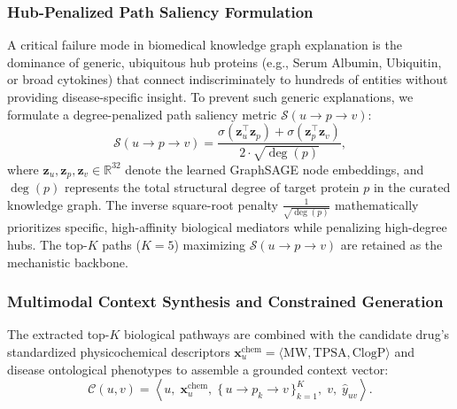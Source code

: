 \documentclass[preprint,12pt]{elsarticle}
\begin{document}
\subsubsection{Hub-Penalized Path Saliency Formulation}
A critical failure mode in biomedical knowledge graph explanation is the dominance of generic, ubiquitous hub proteins (e.g., Serum Albumin, Ubiquitin, or broad cytokines) that connect indiscriminately to hundreds of entities without providing disease-specific insight. To prevent such generic explanations, we formulate a degree-penalized path saliency metric $\mathcal{S}(u \to p \to v)$:
\begin{equation}
    \mathcal{S}(u \to p \to v) = \frac{\sigma\left(\mathbf{z}_u^\top \mathbf{z}_p\right) + \sigma\left(\mathbf{z}_p^\top \mathbf{z}_v\right)}{2 \cdot \sqrt{\deg(p)}},
\end{equation}
where $\mathbf{z}_u, \mathbf{z}_p, \mathbf{z}_v \in \mathbb{R}^{32}$ denote the learned GraphSAGE node embeddings, and $\deg(p)$ represents the total structural degree of target protein $p$ in the curated knowledge graph. The inverse square-root penalty $\frac{1}{\sqrt{\deg(p)}}$ mathematically prioritizes specific, high-affinity biological mediators while penalizing high-degree hubs. The top-$K$ paths ($K=5$) maximizing $\mathcal{S}(u \to p \to v)$ are retained as the mechanistic backbone.

\subsubsection{Multimodal Context Synthesis and Constrained Generation}
The extracted top-$K$ biological pathways are combined with the candidate drug's standardized physicochemical descriptors $\mathbf{x}_u^{\mathrm{chem}} = \langle \mathrm{MW}, \mathrm{TPSA}, \mathrm{ClogP} \rangle$ and disease ontological phenotypes to assemble a grounded context vector:
\begin{equation}
    \mathcal{C}(u, v) = \left\langle u, \; \mathbf{x}_u^{\mathrm{chem}}, \; \{\, u \to p_k \to v \,\}_{k=1}^K, \; v, \; \hat{y}_{uv} \right\rangle.
\end{equation}
\end{document}
